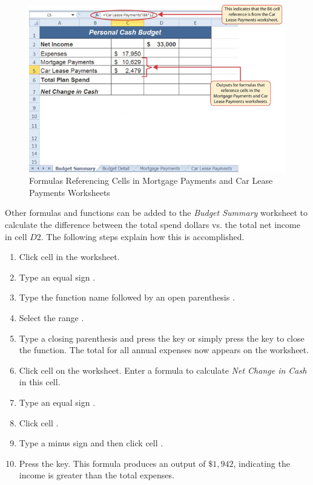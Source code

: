 \begin{figure}[H]
	\centering
	\includegraphics[width=\maxwidth{.95\linewidth}]{gfx/ch02_fig37}
	\caption{Formulas Referencing Cells in Mortgage Payments and Car Lease Payments Worksheets}
	\label{02:fig37}
\end{figure}

Other formulas and functions can be added to the \textit{Budget Summary} worksheet to calculate the difference between the total spend dollars vs. the total net income in cell $ D2 $. The following steps explain how this is accomplished.

\begin{enumbox}
	\begin{enumerate}
		\item Click cell  in the  worksheet.
		\item Type an equal sign \fmtTyping{=}.
		\item Type the function name  followed by an open parenthesis \fmtTyping{(}.
		\item Select the range .
		\item Type a closing parenthesis \fmtTyping{)} and press the  key or simply press the  key to close the function. The total for all annual expenses now appears on the worksheet.
		\item Click cell  on the  worksheet. Enter a formula to calculate \textit{Net Change in Cash} in this cell.
		\item Type an equal sign \fmtTyping{=}.
		\item Click cell .
		\item Type a minus sign \fmtTyping{-} and then click cell .
		\item Press the  key. This formula produces an output of $ \$1,942 $, indicating the income is greater than the total expenses.
	\end{enumerate}
\end{enumbox}

